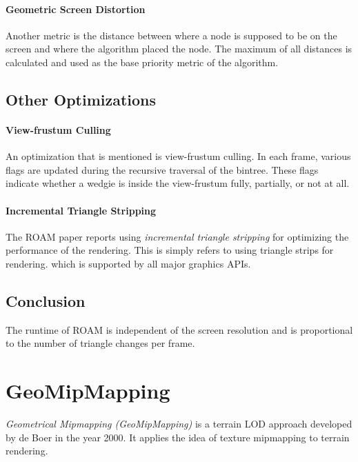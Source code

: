 \paragraph{Geometric Screen Distortion}
Another metric is the distance between where a node is supposed to be on the screen and where the algorithm placed the node.
The maximum of all distances is calculated and used as the base priority metric of the algorithm.

\subsection{Other Optimizations}
\paragraph{View-frustum Culling}
An optimization that is mentioned is view-frustum culling. In each frame, various flags are updated during 
the recursive traversal of the bintree. These flags indicate whether a wedgie is inside the view-frustum 
fully, partially, or not at all.

\paragraph{Incremental Triangle Stripping}
The ROAM paper reports using \textit{incremental triangle stripping} for optimizing the performance of the rendering.
This is simply refers to using triangle strips for rendering. which is supported by all major graphics APIs.

\subsection{Conclusion}
The runtime of ROAM is independent of the screen resolution and is proportional to the 
number of triangle changes per frame. 


\section{GeoMipMapping}
\textit{Geometrical Mipmapping (GeoMipMapping)} is a terrain LOD approach developed by de Boer \cite{geomipmapping} in the year 2000. 
It applies the idea of texture mipmapping to terrain rendering.

